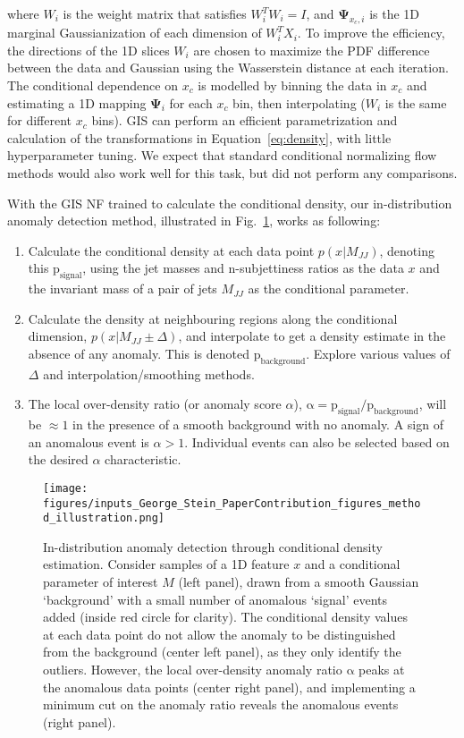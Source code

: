 \documentclass[a4paper,11pt]{article}
\begin{document}
where $W_i$ is the weight matrix that satisfies $W_i^TW_i=I$, and $\mathbf{\Psi}_{x_c,i}$ is the 1D marginal Gaussianization of each dimension of $W_i^T X_i$.
To improve the efficiency, the directions of the 1D slices $W_i$ are chosen to maximize the PDF difference between the data and Gaussian using the Wasserstein distance at each iteration. The conditional dependence on $x_c$ is modelled by binning the data in $x_c$ and estimating a 1D mapping $\mathbf{\Psi}_i$ for each $x_c$ bin, then interpolating ($W_i$ is the same for different $x_c$ bins). 
GIS can perform an efficient parametrization and calculation of the transformations in Equation~\ref{eq:density}, with little hyperparameter tuning. We expect that standard conditional normalizing flow methods would also work well for this task, but did not perform any comparisons.

With the GIS NF trained to calculate the conditional density, our in-distribution anomaly detection method, illustrated in Fig.~\ref{fig:method}, works as following: 
\begin{enumerate}
    \itemsep-0em 
    \item Calculate the conditional density at each data point $p(x|M_{JJ})$, denoting this $\mathrm{p_{signal}}$, using the jet masses and n-subjettiness ratios as the data $x$ and the invariant mass of a pair of jets $M_{JJ}$ as the conditional parameter.\item Calculate the density at neighbouring regions along the conditional dimension, $p(x | M_{JJ} \pm \Delta)$, and interpolate to get a density estimate in the absence of any anomaly. This is denoted $\mathrm{p_{background}}$. Explore various values of $\Delta$ and interpolation/smoothing methods. 
    \item The local over-density ratio (or anomaly score $\alpha$), $\mathrm{\alpha = p_{signal}/p_{background}}$, will be $\approx1$ in the presence of a smooth background with no anomaly. 
A sign of an anomalous event is $\alpha>1$. 
    Individual events can also be selected based on the desired $\alpha$ characteristic.
\end{enumerate}

\begin{figure}[h]
  \centering
  \texttt{[image: figures/inputs\_George\_Stein\_PaperContribution\_figures\_method\_illustration.png]}
   \caption{In-distribution anomaly detection through conditional density estimation. Consider samples of a 1D feature $x$ and a conditional parameter of interest $M$ (left panel), drawn from a smooth Gaussian `background' with a small number of anomalous `signal' events added (inside red circle for clarity). The conditional density values at each data point do not allow the anomaly to be distinguished from the background (center left panel), as they only identify the outliers. However, the local over-density anomaly ratio $\mathrm{\alpha}$ peaks at the anomalous data points (center right panel), and implementing a minimum cut on the anomaly ratio reveals the anomalous events (right panel).}
  \label{fig:method}
\end{figure}
\end{document}
